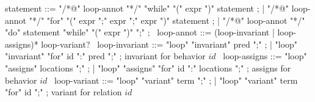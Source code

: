 \begin{syntax}
  statement ::= "/*@" loop-annot "*/" "while" "(" expr ")" statement ;
  | "/*@" loop-annot "*/" "for" "(" expr ";" expr ";" expr ")" statement ;
  | "/*@" loop-annot "*/" "do" statement "while" "(" expr ")" ";" ;
  \
  loop-annot ::= (loop-invariant | loop-assigns)* loop-variant?
  \
  loop-invariant ::= "loop" "invariant" pred ";" ;
  | "loop" "invariant" "for" id ":" pred ";" ; invariant for behavior $id$
  \
  loop-assigns ::= "loop" "assigns" locations ";" ;
  | "loop" "assigns" "for" id ":" locations ";" ; assigns for behavior $id$
  \
  loop-variant ::= "loop" "variant" term ";" ;
  | "loop" "variant" term "for" id ";" ; variant for relation $id$
  \
\end{syntax}

